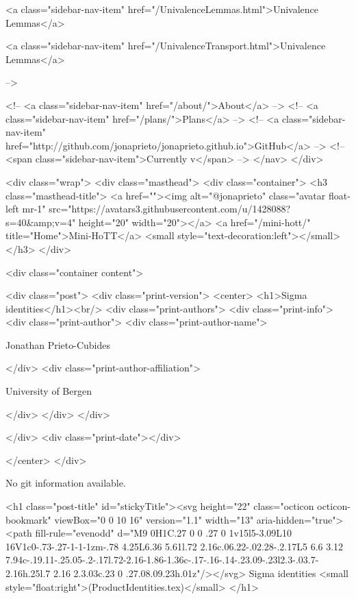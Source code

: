           <a class="sidebar-nav-item" href="/UnivalenceLemmas.html">Univalence Lemmas</a>
        
      
    
      
        
          <a class="sidebar-nav-item" href="/UnivalenceTransport.html">Univalence Lemmas</a>
        
      
     -->

    <!-- <a class="sidebar-nav-item" href="/about/">About</a> -->
    <!-- <a class="sidebar-nav-item" href="/plans/">Plans</a> -->
    <!-- <a class="sidebar-nav-item" href="http://github.com/jonaprieto/jonaprieto.github.io">GitHub</a> -->
    <!-- <span class="sidebar-nav-item">Currently v</span> -->
  </nav>
</div>

    <div class="wrap">
      <div class="masthead">
        <div class="container">
          <h3 class="masthead-title">
            <a href=""><img alt="@jonaprieto" class="avatar float-left mr-1" src="https://avatars3.githubusercontent.com/u/1428088?s=40&amp;v=4" height="20" width="20"></a>
            <a href="/mini-hott/" title="Home">Mini-HoTT</a>
            <small style="text-decoration:left"></small>
          </h3>
        </div>
      
      <div class="container content">
        







<div class="post">
  <div class="print-version">
    <center>
      <h1>Sigma identities</h1><br/>
        <div class="print-authors">
          <div class="print-info">
            <div class="print-author">
              <div class="print-author-name">
                
                  Jonathan Prieto-Cubides
                
              </div>
              <div class="print-author-affiliation">
                
                  University of Bergen
                
                </div>
            </div>
          </div>
          
          
        </div>
        <div class="print-date"></div>
        
        
    </center>
  </div>

  
  No git information available.
  

  <h1 class="post-title" id="stickyTitle"><svg height="22" class="octicon octicon-bookmark" viewBox="0 0 10 16" version="1.1" width="13" aria-hidden="true"><path fill-rule="evenodd" d="M9 0H1C.27 0 0 .27 0 1v15l5-3.09L10 16V1c0-.73-.27-1-1-1zm-.78 4.25L6.36 5.61l.72 2.16c.06.22-.02.28-.2.17L5 6.6 3.12 7.94c-.19.11-.25.05-.2-.17l.72-2.16-1.86-1.36c-.17-.16-.14-.23.09-.23l2.3-.03.7-2.16h.25l.7 2.16 2.3.03c.23 0 .27.08.09.23h.01z"/></svg> Sigma identities <small style="float:right">(ProductIdentities.tex)</small>
  </h1>

